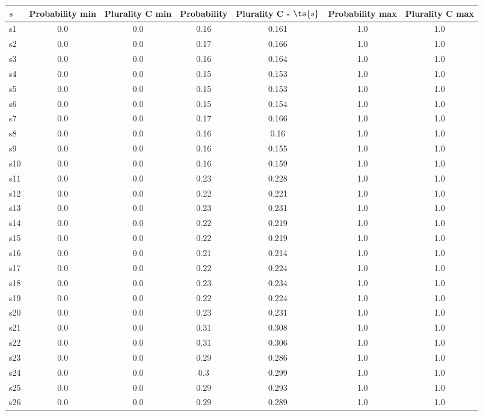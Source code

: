 \documentclass{article}
\begin{document}
\noindent\begin{tabular}{|l|c|c|c|c|c|c|}
\hline
$s$& Probability min & Plurality C min & Probability & Plurality C - $\ts{s}$ & Probability max & Plurality C max\\
\hline
s1 &0.0 & 0.0 & 0.16 & 0.161 & 1.0 & 1.0\\
\hline
s2 &0.0 & 0.0 & 0.17 & 0.166 & 1.0 & 1.0\\
\hline
s3 &0.0 & 0.0 & 0.16 & 0.164 & 1.0 & 1.0\\
\hline
s4 &0.0 & 0.0 & 0.15 & 0.153 & 1.0 & 1.0\\
\hline
s5 &0.0 & 0.0 & 0.15 & 0.153 & 1.0 & 1.0\\
\hline
s6 &0.0 & 0.0 & 0.15 & 0.154 & 1.0 & 1.0\\
\hline
s7 &0.0 & 0.0 & 0.17 & 0.166 & 1.0 & 1.0\\
\hline
s8 &0.0 & 0.0 & 0.16 & 0.16 & 1.0 & 1.0\\
\hline
s9 &0.0 & 0.0 & 0.16 & 0.155 & 1.0 & 1.0\\
\hline
s10 &0.0 & 0.0 & 0.16 & 0.159 & 1.0 & 1.0\\
\hline
s11 &0.0 & 0.0 & 0.23 & 0.228 & 1.0 & 1.0\\
\hline
s12 &0.0 & 0.0 & 0.22 & 0.221 & 1.0 & 1.0\\
\hline
s13 &0.0 & 0.0 & 0.23 & 0.231 & 1.0 & 1.0\\
\hline
s14 &0.0 & 0.0 & 0.22 & 0.219 & 1.0 & 1.0\\
\hline
s15 &0.0 & 0.0 & 0.22 & 0.219 & 1.0 & 1.0\\
\hline
s16 &0.0 & 0.0 & 0.21 & 0.214 & 1.0 & 1.0\\
\hline
s17 &0.0 & 0.0 & 0.22 & 0.224 & 1.0 & 1.0\\
\hline
s18 &0.0 & 0.0 & 0.23 & 0.234 & 1.0 & 1.0\\
\hline
s19 &0.0 & 0.0 & 0.22 & 0.224 & 1.0 & 1.0\\
\hline
s20 &0.0 & 0.0 & 0.23 & 0.231 & 1.0 & 1.0\\
\hline
s21 &0.0 & 0.0 & 0.31 & 0.308 & 1.0 & 1.0\\
\hline
s22 &0.0 & 0.0 & 0.31 & 0.306 & 1.0 & 1.0\\
\hline
s23 &0.0 & 0.0 & 0.29 & 0.286 & 1.0 & 1.0\\
\hline
s24 &0.0 & 0.0 & 0.3 & 0.299 & 1.0 & 1.0\\
\hline
s25 &0.0 & 0.0 & 0.29 & 0.293 & 1.0 & 1.0\\
\hline
s26 &0.0 & 0.0 & 0.29 & 0.289 & 1.0 & 1.0\\

\end{tabular}
\end{document}
